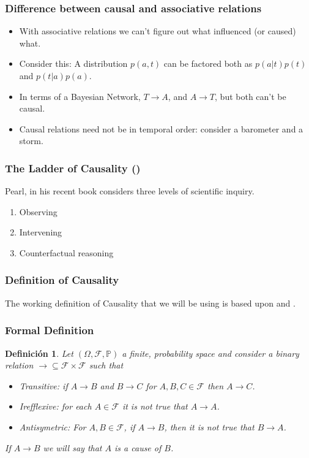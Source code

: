 \documentclass{beamer}
\theoremstyle{plain}
\newtheorem{defi}[teo]{Definición}
\begin{document}
		\begin{frame}
		\frametitle{Difference between causal and associative relations}
		\begin{itemize}
		\item With associative relations we can't figure out what influenced (or caused) what.
		\item Consider this: A distribution $p(a,t)$ can be factored both as $p(a|t)p(t)$ and $p(t|a)p(a)$. 
		\item In terms of a Bayesian Network, $T \to A$, and $A \to T$, but both can't be causal.
		\item Causal relations need not be in temporal order: consider a barometer and a storm.
		\end{itemize}
		\end{frame}
		
		
		
		\begin{frame}
		\frametitle{The Ladder of Causality (\cite{pearlwhy})}
		Pearl, in his recent book \cite{pearl2018why} considers three levels of scientific inquiry.
		\begin{enumerate}
		\item Observing
		\item Intervening
		\item Counterfactual reasoning
		\end{enumerate}
		\end{frame}
		
		\begin{frame}
		\frametitle{Definition of Causality}
		The working definition of Causality that we will be using is based upon \cite{spirtes2000causation} and \cite{pearl2009causality}.
		\end{frame}
		
		\begin{frame}
		\frametitle{Formal Definition}
		\begin{defi}
		Let $(\Omega, \mathcal{F}, \mathbb{P})$ a finite, probability space and consider a binary relation  $\to  \subseteq \mathcal{F} \times \mathcal{F}$ such that
		\begin{itemize}
		\item Transitive: if $A \to B$ and $B \to C$ for $A,B,C \in \mathcal{F}$ then $A \to C$.
		\item  Irefflexive: for each $A \in \mathcal{F}$ it is not true that $A \to A$.
		\item Antisymetric: For $A, B \in \mathcal{F}$, if $A \to B$, then it is not true that $B \to A$.
		\end{itemize}
		If $A \to B$ we will say that $A$ is a cause of $B$.
		\end{defi}
		\end{frame}
\end{document}
